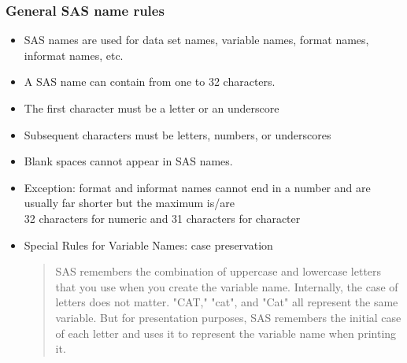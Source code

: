\documentclass[11pt,pdftex,dvipsnames,usenames,helvetica]{beamer}
\begin{document}
\begin{frame}[fragile]
\frametitle{General SAS name rules}
\begin{itemize}
\item SAS names are used for data set names, variable names, format names, 
informat names, etc.
\item A SAS name can contain from one to 32 characters.
\item The first character must be a letter or an underscore 
\item Subsequent characters must be letters, numbers, or underscores
\item Blank spaces cannot appear in SAS names.
\item Exception: format and informat names cannot end in a number and
are usually far shorter but the maximum is/are\\ 
32 characters for numeric and
31 characters for character
\item Special Rules for Variable Names: case preservation\\
\begin{quote}
  SAS remembers the combination of uppercase
  and lowercase letters that you use when you create the variable
  name. Internally, the case of letters does not matter. "CAT," "cat",
  and "Cat" all represent the same variable. But for presentation
  purposes, SAS remembers the initial case of each letter and uses it
  to represent the variable name when printing it.
\end{quote}
\end{itemize}
\end{frame}
\end{document}
